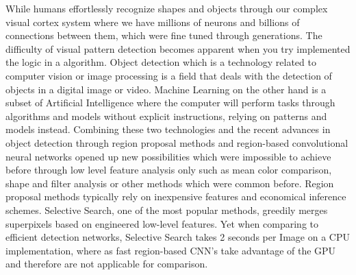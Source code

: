 
While humans effortlessly recognize shapes and objects through our complex visual cortex system where we have millions of neurons and billions of connections between them, which were fine tuned through generations. The difficulty of visual pattern detection becomes apparent when you try implemented the logic in a algorithm.\cite{neuralnetworksanddeeplearning} 
\newline
\newline
Object detection which is a technology related to computer vision or image processing is a field that deals with the detection of objects in a digital image or video.
\newline
Machine Learning on the other hand is a subset of Artificial Intelligence where the computer will perform tasks through algorithms and models without explicit instructions, relying on patterns  and models instead.
\newline
\newline
Combining these two technologies and the recent advances in object detection through region proposal methods and region-based convolutional
neural networks opened up new possibilities which were impossible to achieve before through low level feature analysis only such as mean color comparison, shape and filter analysis or other methods which were common before.
\newline
\newline
Region proposal methods typically rely on inexpensive features and economical inference schemes. Selective Search, one of the most popular
methods, greedily merges superpixels based on engineered low-level features. Yet when comparing to efficient detection networks, Selective
Search takes 2 seconds per Image on a CPU implementation, where as fast region-based CNN's take advantage of the GPU and therefore are not applicable for comparison.\cite{fasterrcnn}
\newline

